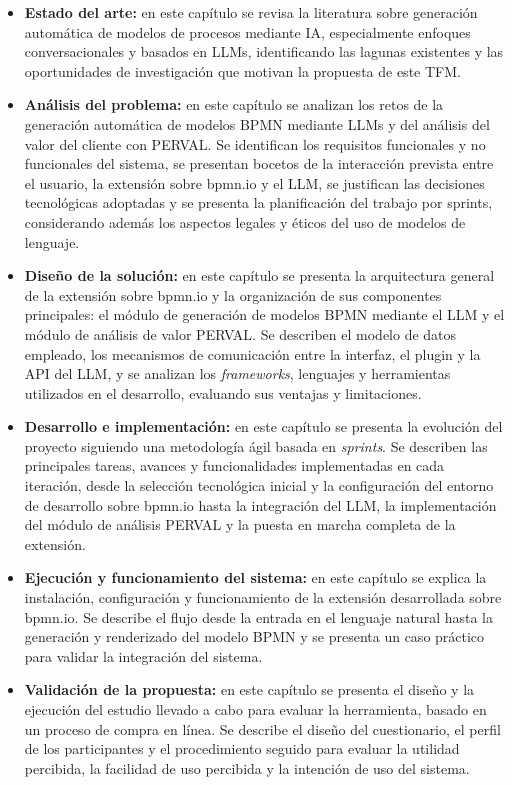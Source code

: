 \begin{itemize}
    \item[$\bullet$] \textbf{Estado del arte:} en este capítulo se revisa la literatura sobre generación automática de modelos de procesos mediante IA, especialmente enfoques conversacionales y basados en LLMs, identificando las lagunas existentes y las oportunidades de investigación que motivan la propuesta de este TFM.
    \item[$\bullet$] \textbf{Análisis del problema:} en este capítulo se analizan los retos de la generación automática de modelos BPMN mediante LLMs y del análisis del valor del cliente con PERVAL. Se identifican los requisitos funcionales y no funcionales del sistema, se presentan bocetos de la interacción prevista entre el usuario, la extensión sobre bpmn.io y el LLM, se justifican las decisiones tecnológicas adoptadas y se presenta la planificación del trabajo por sprints, considerando además los aspectos legales y éticos del uso de modelos de lenguaje.
    \item[$\bullet$] \textbf{Diseño de la solución:} en este capítulo se presenta la arquitectura general de la extensión sobre bpmn.io y la organización de sus componentes principales: el módulo de generación de modelos BPMN mediante el LLM y el módulo de análisis de valor PERVAL. Se describen el modelo de datos empleado, los mecanismos de comunicación entre la interfaz, el plugin y la API del LLM, y se analizan los \textit{frameworks}, lenguajes y herramientas utilizados en el desarrollo, evaluando sus ventajas y limitaciones.
    \item[$\bullet$] \textbf{Desarrollo e implementación: } en este capítulo se presenta la evolución del proyecto siguiendo una metodología ágil basada en \textit{sprints}. Se describen las principales tareas, avances y funcionalidades implementadas en cada iteración, desde la selección tecnológica inicial y la configuración del entorno de desarrollo sobre bpmn.io hasta la integración del LLM, la implementación del módulo de análisis PERVAL y la puesta en marcha completa de la extensión.
    \item[$\bullet$] \textbf{Ejecución y funcionamiento del sistema:} en este capítulo se explica la instalación, configuración y funcionamiento de la extensión desarrollada sobre bpmn.io. Se describe el flujo desde la entrada en el lenguaje natural hasta la generación y renderizado del modelo BPMN y se presenta un caso práctico para validar la integración del sistema.  
    \item[$\bullet$] \textbf{Validación de la propuesta:} en este capítulo se presenta el diseño y la ejecución del estudio llevado a cabo para evaluar la herramienta, basado en un proceso de compra en línea. Se describe el diseño del cuestionario, el perfil de los participantes y el procedimiento seguido para evaluar la utilidad percibida, la facilidad de uso percibida y la intención de uso del sistema.


\end{itemize}

